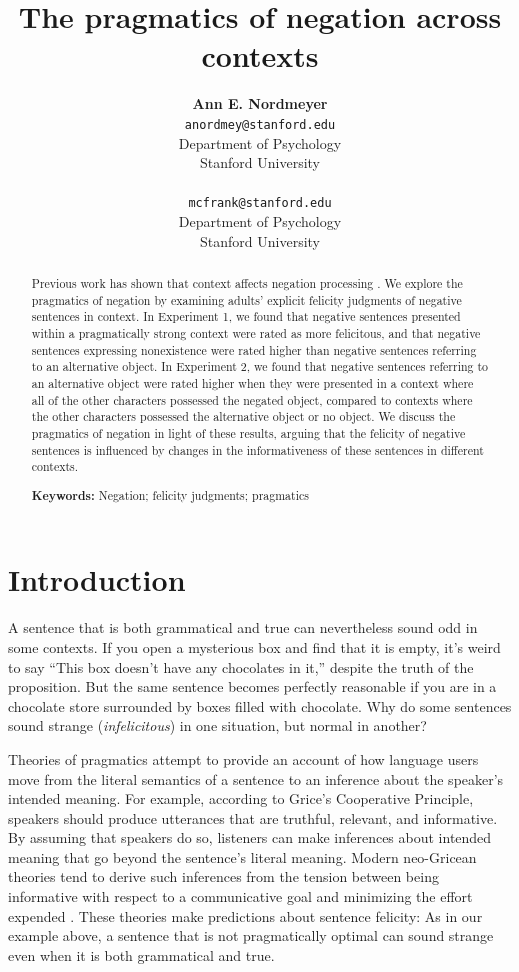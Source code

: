 \documentclass[10pt,letterpaper]{article}
\title{The pragmatics of negation across contexts}
\author{{\large \bf Ann E. Nordmeyer} \\ \texttt{anordmey@stanford.edu}\\ Department of Psychology \\ Stanford University \\ 
\And {\large \bf Michael C. Frank} \\ \texttt{mcfrank@stanford.edu} \\ Department of Psychology \\ Stanford University \\ }
\begin{document}
\maketitle


\begin{abstract}
Previous work has shown that context affects negation processing \cite{wason1965, nordmeyer2014}.  We explore the pragmatics of negation by examining adults' explicit felicity judgments of negative sentences in context.  In Experiment 1, we found that negative sentences presented within a pragmatically strong context were rated as more felicitous, and that negative sentences expressing nonexistence were rated higher than negative sentences referring to an alternative object.  In Experiment 2, we found that negative sentences referring to an alternative object were rated higher when they were presented in a context where all of the other characters possessed the negated object, compared to contexts where the other characters possessed the alternative object or no object.  We discuss the pragmatics of negation in light of these results, arguing that the felicity of negative sentences is influenced by changes in the informativeness of these sentences in different contexts. 

\textbf{Keywords:} 
Negation; felicity judgments; pragmatics
\end{abstract}

\section{Introduction}

A sentence that is both grammatical and true can nevertheless sound odd in some contexts. If you open a mysterious box and find that it is empty, it's weird to say ``This box doesn't have any chocolates in it,'' despite the truth of the proposition. But the same sentence becomes perfectly reasonable if you are in a chocolate store surrounded by boxes filled with chocolate.  Why do some sentences sound strange (\emph{infelicitous}) in one situation, but normal in another?

Theories of pragmatics attempt to provide an account of how language users move from the literal semantics of a sentence to an inference about the speaker's intended meaning. For example, according to Grice's \citeyear{grice1975} Cooperative Principle, speakers should produce utterances that are truthful, relevant, and informative.  By assuming that speakers do so, listeners can make inferences about intended meaning that go beyond the sentence's literal meaning. Modern neo-Gricean theories tend to derive such inferences from the tension between being informative with respect to a communicative goal and minimizing the effort expended \cite{horn1984,levinson2000,frank2012}. These theories make predictions about sentence felicity: As in our example above, a sentence that is not pragmatically optimal can sound strange even when it is both grammatical and true.
\end{document}
